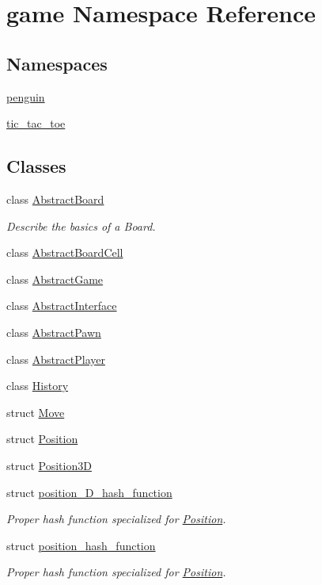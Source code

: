 \hypertarget{namespacegame}{}\section{game Namespace Reference}
\label{namespacegame}
\subsection*{Namespaces}
\begin{DoxyCompactItemize}
\item 
 \hyperlink{namespacegame_1_1penguin}{penguin}
\item 
 \hyperlink{namespacegame_1_1tic__tac__toe}{tic\+\_\+tac\+\_\+toe}
\end{DoxyCompactItemize}
\subsection*{Classes}
\begin{DoxyCompactItemize}
\item 
class \hyperlink{classgame_1_1_abstract_board}{Abstract\+Board}
\begin{DoxyCompactList}\small\item\em Describe the basics of a Board. \end{DoxyCompactList}\item 
class \hyperlink{classgame_1_1_abstract_board_cell}{Abstract\+Board\+Cell}
\item 
class \hyperlink{classgame_1_1_abstract_game}{Abstract\+Game}
\item 
class \hyperlink{classgame_1_1_abstract_interface}{Abstract\+Interface}
\item 
class \hyperlink{classgame_1_1_abstract_pawn}{Abstract\+Pawn}
\item 
class \hyperlink{classgame_1_1_abstract_player}{Abstract\+Player}
\item 
class \hyperlink{classgame_1_1_history}{History}
\item 
struct \hyperlink{structgame_1_1_move}{Move}
\item 
struct \hyperlink{structgame_1_1_position}{Position}
\item 
struct \hyperlink{structgame_1_1_position3_d}{Position3D}
\item 
struct \hyperlink{structgame_1_1position__3_d__hash__function}{position\+\_\+D\+\_\+hash\+\_\+function}
\begin{DoxyCompactList}\small\item\em Proper hash function specialized for \hyperlink{structgame_1_1_position}{Position}. \end{DoxyCompactList}\item 
struct \hyperlink{structgame_1_1position__hash__function}{position\+\_\+hash\+\_\+function}
\begin{DoxyCompactList}\small\item\em Proper hash function specialized for \hyperlink{structgame_1_1_position}{Position}. \end{DoxyCompactList}\end{DoxyCompactItemize}

